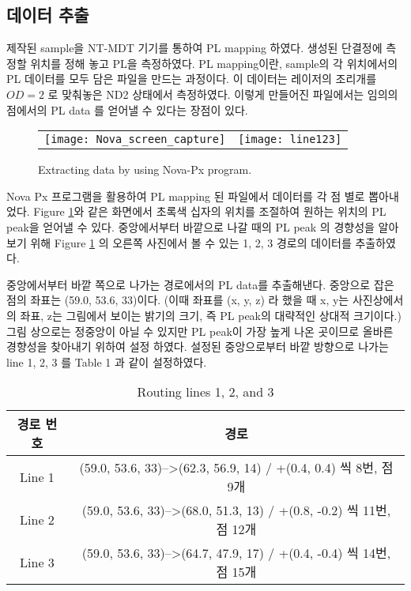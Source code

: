 \subsection{데이터 추출}
제작된 sample을 NT-MDT 기기를 통하여 PL mapping 하였다. 생성된 단결정에 측정할 위치를 정해 놓고 PL을 측정하였다.  PL mapping이란, sample의 각 위치에서의 PL 데이터를 모두 담은 파일을 만드는 과정이다. 이 데이터는 레이저의 조리개를 $OD = 2$ 로 맞춰놓은 ND2 상태에서 측정하였다. 이렇게 만들어진 파일에서는 임의의 점에서의 PL data 를 얻어낼 수 있다는 장점이 있다.
\begin{figure}[H]
	\begin{center}
		\begin{tabular}{cc}
			\texttt{[image: Nova\_screen\_capture]}&
			\texttt{[image: line123]}
		\end{tabular}
	\end{center}
	\caption{Extracting data by using Nova-Px program.}
	\label{fig:nova}  
\end{figure}
Nova Px 프로그램을 활용하여 PL mapping 된 파일에서 데이터를 각 점 별로 뽑아내었다. Figure \ref{fig:nova}와 같은 화면에서 초록색 십자의 위치를 조절하여 원하는 위치의 PL peak을 얻어낼 수 있다. 중앙에서부터 바깥으로 나갈 때의 PL peak 의 경향성을 알아보기 위해 Figure \ref{fig:nova} 의 오른쪽 사진에서 볼 수 있는 1, 2, 3 경로의 데이터를 추출하였다.

중앙에서부터 바깥 쪽으로 나가는 경로에서의 PL data를 추출해낸다. 중앙으로 잡은 점의 좌표는 (59.0, 53.6, 33)이다. (이때 좌표를 (x, y, z) 라 했을 때 x, y는 사진상에서의 좌표, z는 그림에서 보이는 밝기의 크기, 즉 PL peak의 대략적인 상대적 크기이다.) 그림 상으로는 정중앙이 아닐 수 있지만 PL peak이 가장 높게 나온 곳이므로 올바른 경향성을 찾아내기 위하여 설정 하였다. 설정된 중앙으로부터 바깥 방향으로 나가는 line 1, 2, 3 를 Table 1 과 같이 설정하였다.

\begin{table}[H]%
	\caption{Routing lines 1, 2, and 3}
	\label{table01}
	\centering
	\begin{tabular}{c c}
	\toprule
	경로 번호 & 경로\\
	\toprule
	Line 1 & (59.0, 53.6, 33)-->(62.3, 56.9, 14) / +(0.4, 0.4) 씩 8번, 점 9개\\
	Line 2 & (59.0, 53.6, 33)-->(68.0, 51.3, 13) / +(0.8, -0.2) 씩 11번, 점 12개\\
	Line 3 & (59.0, 53.6, 33)-->(64.7, 47.9, 17) / +(0.4, -0.4) 씩 14번, 점 15개\\
	\toprule
	\end{tabular}
	\end{table}

